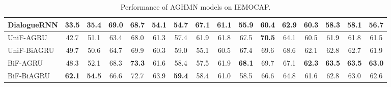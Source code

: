 \documentclass[letterpaper]{article} %
\begin{document}
\begin{table}[t!]
\begin{threeparttable}
{\begin{tabular}{l|cc|cc|cc|cc|cc|cc|ccc}
DialogueRNN & 33.5& 35.4& \bf69.0& 68.7& 54.1& 54.7& \bf67.1& 61.1& 55.9& 60.4& 62.9& 60.3& 58.3& 58.1& 56.7 \\
\hline
UniF-AGRU & 42.7& 51.1& 63.4& 68.0& 61.3& 57.4& 61.9& 61.8& 67.5& \bf70.5& 64.1& 60.5& 61.9& 61.8& 61.5 \\
UniF-BiAGRU & 49.7& 50.6& 64.7& 69.9& 60.3& 59.0& 55.1& 60.5& 67.4& 69.6& 68.6& 62.1& 62.8& 62.7& 61.9 \\
BiF-AGRU & 48.3& 52.1& 68.3& \bf73.3& 61.6& 58.4& 57.5& 61.9& \bf68.1& 69.7& 67.1& \bf62.3& \bf63.5& \bf63.5& \bf63.0 \\
BiF-BiAGRU & \bf62.1& \bf54.5& 66.6& 72.7& 63.9& \bf59.4& 58.4& 61.0& 58.5& 66.6& 64.8& 61.6& 62.8& 63.0& 62.6 \\
\bottomrule
\end{tabular}
}
\end{threeparttable}
\caption{\label{table:result_IEMOCAP}Performance of AGHMN models on IEMOCAP.}
\end{table}
\end{document}
